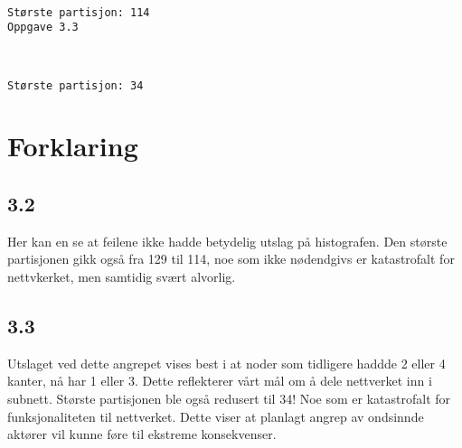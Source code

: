 \documentclass[11pt]{article}
\begin{document}
    \begin{center}
    \end{center}
    { \hspace*{\fill} \\}
    
    \begin{Verbatim}[commandchars=\\\{\}]
Største partisjon: 114
Oppgave 3.3
    \end{Verbatim}

    \begin{center}
    \end{center}
    { \hspace*{\fill} \\}
    
    \begin{Verbatim}[commandchars=\\\{\}]
Største partisjon: 34
    \end{Verbatim}

    \hypertarget{forklaring}{%
\section*{Forklaring}\label{forklaring}}

\hypertarget{section*}{%
\subsection*{3.2}\label{section*}}

Her kan en se at feilene ikke hadde betydelig utslag på histografen. Den
største partisjonen gikk også fra 129 til 114, noe som ikke nødendgivs
er katastrofalt for nettvkerket, men samtidig svært alvorlig.

\hypertarget{section*-1}{%
\subsection*{3.3}\label{section*-1}}

Utslaget ved dette angrepet vises best i at noder som tidligere haddde 2
eller 4 kanter, nå har 1 eller 3. Dette reflekterer vårt mål om å dele
nettverket inn i subnett. Største partisjonen ble også redusert til 34!
Noe som er katastrofalt for funksjonaliteten til nettverket. Dette viser
at planlagt angrep av ondsinnde aktører vil kunne føre til ekstreme
konsekvenser.
\end{document}
